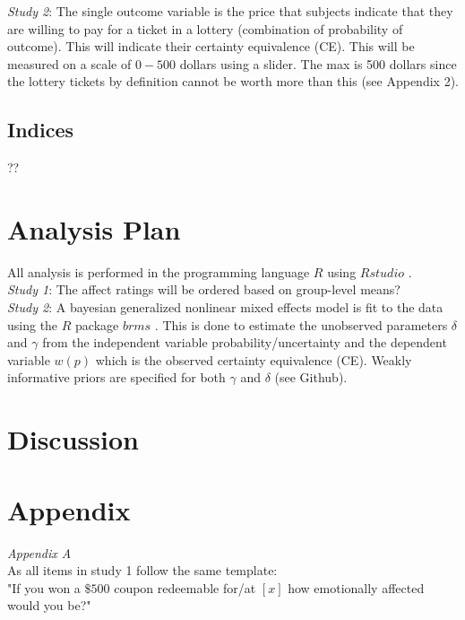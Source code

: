 \documentclass[12pt]{article}
\begin{document}
\emph{Study 2}: The single outcome variable
is the price that subjects indicate that they
are willing to pay for a ticket in a lottery
(combination of probability of outcome).
This will indicate their certainty equivalence (CE).
This will be measured on a scale of $0-500$ dollars
using a slider. The max is 500 dollars since the
lottery tickets by definition cannot be worth
more than this (see Appendix 2).

\subsection{Indices}

??

\section{Analysis Plan}

All analysis is performed in the programming
language $R$ \autocite{rcore} using $Rstudio$
\autocite{rstudio}. \\

\emph{Study 1}: The affect ratings will be
ordered based on group-level means? \\

\emph{Study 2}: A bayesian generalized nonlinear
mixed effects model is fit to the data using the
$R$ package $brms$ \autocite{brms}.
This is done to estimate the unobserved parameters
$\delta$ and $\gamma$ from the independent variable
probability/uncertainty and the dependent variable
$w(p)$ which is the observed certainty equivalence (CE).
Weakly informative priors are specified for both
$\gamma$ and $\delta$ (see Github).


\section{Discussion}

\printbibliography

\section{Appendix}

\emph{Appendix A} \\
As all items in study 1 follow the same template: \\

"If you won a $\$500$ coupon redeemable for/at
$[x]$ how emotionally affected would you be?" \\
\end{document}
